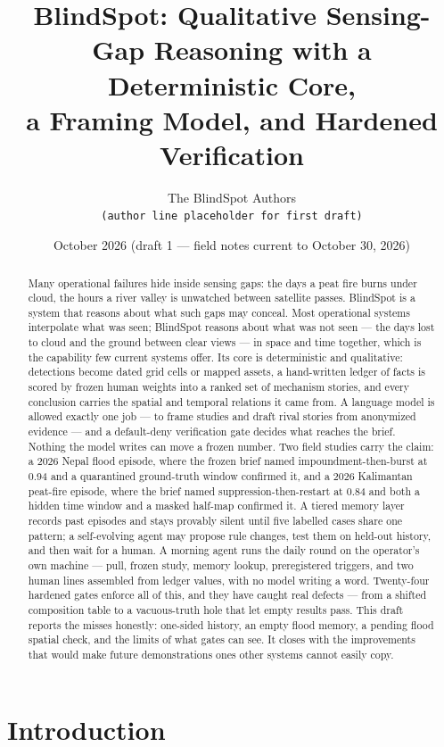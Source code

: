\documentclass[11pt]{article}
\title{BlindSpot: Qualitative Sensing-Gap Reasoning with a Deterministic Core,\\
a Framing Model, and Hardened Verification}
\author{The BlindSpot Authors\\ \texttt{(author line placeholder for first draft)}}
\date{October 2026 (draft 1 --- field notes current to October 30, 2026)}
\begin{document}
\maketitle

\begin{abstract}
Many operational failures hide inside sensing gaps: the days a peat fire burns
under cloud, the hours a river valley is unwatched between satellite passes.
BlindSpot is a system that reasons about what such gaps may conceal. Most
operational systems interpolate what was seen; BlindSpot reasons about what
was not seen — the days lost to cloud and the ground between clear views —
in space and time together, which is the capability few current systems
offer. Its core
is deterministic and qualitative: detections become dated grid cells or mapped
assets, a hand-written ledger of facts is scored by frozen human weights into a
ranked set of mechanism stories, and every conclusion carries the spatial and
temporal relations it came from. A language model is allowed exactly one job ---
to frame studies and draft rival stories from anonymized evidence --- and a
default-deny verification gate decides what reaches the brief. Nothing the model
writes can move a frozen number. Two field studies carry the claim: a 2026 Nepal
flood episode, where the frozen brief named impoundment-then-burst at 0.94 and a
quarantined ground-truth window confirmed it, and a 2026 Kalimantan peat-fire
episode, where the brief named suppression-then-restart at 0.84 and both a
hidden time window and a masked half-map confirmed it. A tiered memory layer
records past episodes and stays provably silent until five labelled cases share
one pattern; a self-evolving agent may propose rule changes, test them on
held-out history, and then wait for a human. A morning agent runs the daily
round on the operator's own machine — pull, frozen study, memory lookup,
preregistered triggers, and two human lines assembled from ledger values,
with no model writing a word. Twenty-four hardened gates enforce
all of this, and they have caught real defects --- from a shifted composition
table to a vacuous-truth hole that let empty results pass. This draft reports
the misses honestly: one-sided history, an empty flood memory, a pending flood
spatial check, and the limits of what gates can see. It closes with the
improvements that would make future demonstrations ones other systems cannot
easily copy.
\end{abstract}

\section{Introduction}
\label{sec:intro}
\end{document}
